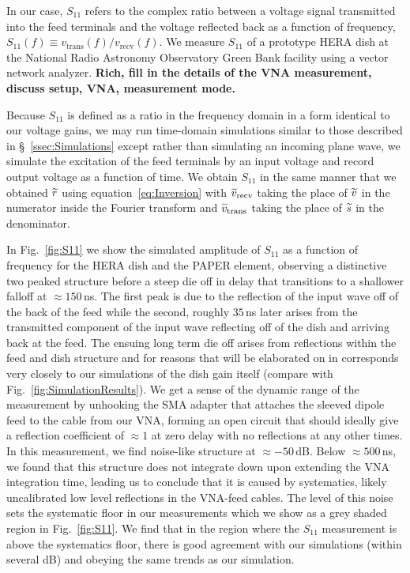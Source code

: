 \documentclass[twocolumn]{emulateapj}
\begin{document}
In our case, $S_{11}$ refers to the complex ratio between a voltage signal transmitted into the feed terminals and the voltage reflected back as a function of frequency, $ S_{11}(f) \equiv v_\text{trans}(f)/v_\text{recv}(f) $. We measure $S_{11}$ of a prototype HERA dish at the National Radio Astronomy Observatory Green Bank facility using a vector network analyzer. {\bf \color{red} Rich, fill in the details of the VNA measurement, discuss setup, VNA, measurement mode. }

Because $S_{11}$ is defined as a ratio in the frequency domain in a form identical to our voltage gains, we may run time-domain simulations similar to those described in \S~\ref{ssec:Simulations} except rather than simulating an incoming plane wave, we simulate the excitation of the feed terminals by an input voltage and record output voltage as a function of time. We obtain $S_{11}$ in the same manner that we obtained ${\widetilde{r}}$ using equation~\ref{eq:Inversion} with ${\widetilde{v}}_\text{recv}$ taking the place of ${\widetilde{v}}$ in the numerator inside the Fourier transform and ${\widetilde{v}}_\text{trans}$ taking the place of ${\widetilde{s}}$ in the denominator. 

In Fig.~\ref{fig:S11} we show the simulated amplitude of $S_{11}$ as a function of frequency for the HERA dish and the PAPER element, observing a distinctive two peaked structure before a steep die off in delay that transitions to a shallower falloff at $\approx 150$\,ns. The first peak is due to the reflection of the input wave off of the back of the feed while the second, roughly $35$\,ns later arises from the transmitted component of the input wave reflecting off of the dish and arriving back at the feed. The ensuing long term die off arises from reflections within the feed and dish structure and for reasons that will be elaborated on in \citet{Patra:2016} corresponds very closely to our simulations of the dish gain itself (compare with Fig.~\ref{fig:SimulationResults}).  We get a sense of the dynamic range of the measurement by unhooking the SMA adapter that attaches the sleeved dipole feed to the cable from our VNA, forming an open circuit that should ideally give a reflection coefficient of $\approx 1$ at zero delay with no reflections at any other times. In this measurement, we find noise-like structure at $\approx -50$\,dB. Below $\approx 500$\,ns, we found that this structure does not integrate down upon extending the VNA integration time, leading us to conclude that it is caused by systematics, likely uncalibrated low level reflections in the VNA-feed cables. The level of this noise sets the systematic floor in our measurements which we show as a grey shaded region in Fig.~\ref{fig:S11}. We find that in the region where the $S_{11}$ measurement is above the systematics floor, there is good agreement with our simulations (within several dB) and obeying the same trends as our simulation.
\end{document}
